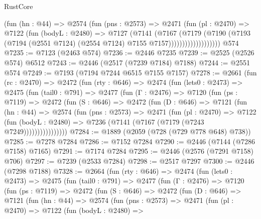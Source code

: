 \begin{lexlean}{RustCore}
\begin{coremodule}
                      (fun (hn : @44) =>
                      @2574
                        (fun (pns : @2573) =>
                        @2471
                          (fun (pl : @2470) =>
                          @7122
                            (fun (bodyL : @2480) =>
                            @7127
                              (@7141
                                (@7167
                                  (@7179
                                    (@7190
                                      (@7193
                                        (@7194
                                          (@2551 @7124)
                                          (@2554 @7124)
                                          @7155
                                          @7157)))))))))))))))))))
    @574
@7235 := @7123 (@2463 @574)
@7236 := @2446 @7235
@7239 := @2525 (@2526 @574) @6512
@7243 := @2446 (@2517 (@7239 @7184) @7188)
@7244 := @2551 @574
@7249 := @7193 (@7194 @7244 @6515 @7155 @7157)
@7278 := @2661
    (fun (rc : @2470) =>
    @2472
      (fun (rty : @646) =>
      @2474
        (fun (lets0 : @2473) =>
        @2475
          (fun (tail0 : @791) =>
          @2477
            (fun (Γ : @2476) =>
            @7120
              (fun (ps : @7119) =>
              @2472
                (fun (S : @646) =>
                @2472
                  (fun (D : @646) =>
                  @7121
                    (fun (hn : @44) =>
                    @2574
                      (fun (pns : @2573) =>
                      @2471
                        (fun (pl : @2470) =>
                        @7122
                          (fun (bodyL : @2480) =>
                          @7236 (@7141 (@7167 (@7179 (@7243 @7249))))))))))))))))
@7284 := @1889 (@2059 (@728 (@729 @778 @648) @738))
@7285 := @7278 @7284
@7286 := @7152 @7284
@7290 := @2446 (@7144 (@7286 @7158) @7165)
@7291 := @7174 @7284
@7295 := @2446 (@2576 (@7291 @7158) @706)
@7297 := @7239 (@2533 @7284)
@7298 := @2517 @7297
@7300 := @2446 (@7298 @7188)
@7328 := @2664
    (fun (rty : @646) =>
    @2474
      (fun (lets0 : @2473) =>
      @2475
        (fun (tail0 : @791) =>
        @2477
          (fun (Γ : @2476) =>
          @7120
            (fun (ps : @7119) =>
            @2472
              (fun (S : @646) =>
              @2472
                (fun (D : @646) =>
                @7121
                  (fun (hn : @44) =>
                  @2574
                    (fun (pns : @2573) =>
                    @2471
                      (fun (pl : @2470) =>
                      @7122
                        (fun (bodyL : @2480) =>

\end{coremodule}
\end{lexlean}
